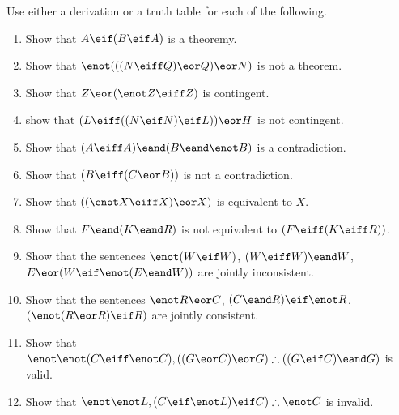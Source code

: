 \noindent\problempart Use either a derivation or a truth table for each of the following.
\begin{enumerate}%
\item Show that $A \eif (B \eif A)$ is a theoremy.
\item Show that $\enot (((N \eiff Q) \eor Q) \eor N)$ is not a theorem.
\item Show that $ Z \eor (\enot Z \eiff Z) $ is contingent.
\item show that $ (L \eiff ((N \eif N) \eif L)) \eor H $ is not contingent.
\item Show that $ (A \eiff A) \eand (B \eand \enot B)$ is a contradiction.
\item Show that $ (B \eiff (C \eor B)) $ is not a contradiction.
\item Show that $ ((\enot X \eiff X) \eor X) $ is equivalent to $X$.
\item Show that $F \eand (K \eand R) $ is not equivalent to $ (F \eiff (K \eiff R)) $.
\item Show that the sentences $ \enot (W \eif W)$, $(W \eiff W) \eand W$, $E \eor (W \eif \enot (E \eand W))$ are jointly inconsistent.
\item Show that the sentences  $\enot R \eor C $, $(C \eand R) \eif \enot R$, $(\enot (R \eor R) \eif R) $ are jointly consistent.
\item Show that $\enot \enot (C \eiff \enot C), ((G \eor C) \eor G) \therefore ((G \eif C) \eand G) $ is valid.
\item Show that $ \enot \enot L,  (C \eif \enot L) \eif C) \therefore \enot C$ is invalid.
\end{enumerate}

